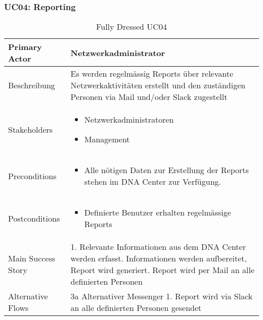\subsubsection{UC04: Reporting}
\begin{table}[H]
	\centering
	\begin{tabularx}{\textwidth}{l | X}
		Primary Actor   & Netzwerkadministrator        \\
		\hline
		Beschreibung   & Es werden regelmässig Reports über relevante Netzwerkaktivitäten erstellt und den zuständigen Personen via Mail und/oder Slack zugestellt  \\ 
		\hline
		Stakeholders       & 
		\begin{itemize}
			\item Netzwerkadministratoren
			\item Management
		\end{itemize} \\ 
		Preconditions      &
		\begin{itemize}	
			\item Alle nötigen Daten zur Erstellung der Reports stehen im DNA Center zur Verfügung.
		\end{itemize}  \\
		\hline
		Postconditions     & 
		\begin{itemize}	
			\item Definierte Benutzer erhalten regelmässige Reports
		\end{itemize}  \\
		\hline
		Main Success Story & 
		1.  Relevante Informationen aus dem DNA Center werden erfasst\newline
		2.  Informationen werden aufbereitet, Report wird generiert\newline
		3.  Report wird per Mail an alle definierten Personen \newline
		\\
		\hline
		Alternative Flows  & 
		3a Alternativer Messenger \newline
		\noindent\hspace*{6mm} 1. Report wird via Slack an alle definierten Personen gesendet \newline
	\end{tabularx}
	\caption{Fully Dressed UC04}
	\label{tab:UC04}
\end{table}

